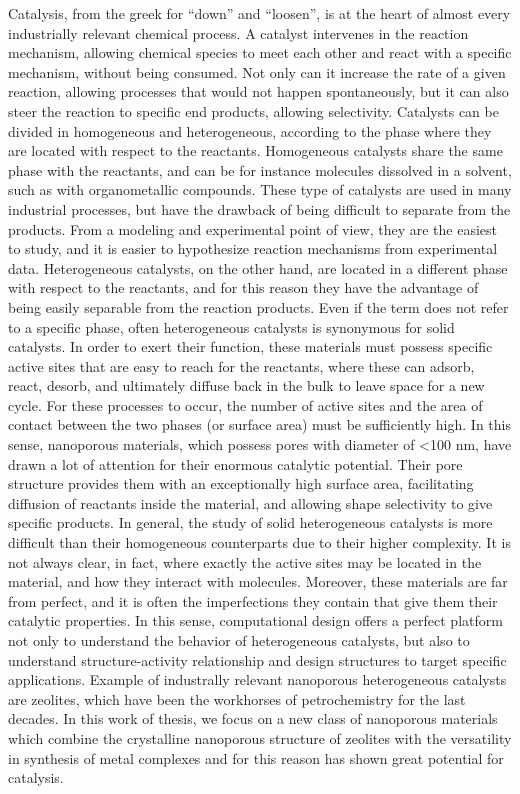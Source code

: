 Catalysis, from the greek for ``down'' and ``loosen'', is at the heart of almost every industrially relevant chemical process. A catalyst intervenes in the reaction mechanism, allowing chemical species to meet each other and react with a specific mechanism, without being consumed. Not only can it increase the rate of a given reaction, allowing processes that would not happen spontaneously, but it can also steer the reaction to specific end products, allowing selectivity. Catalysts can be divided in homogeneous and heterogeneous, according to the phase where they are located with respect to the reactants. Homogeneous catalysts share the same phase with the reactants, and can be for instance molecules dissolved in a solvent, such as with organometallic compounds. These type of catalysts are used in many industrial processes,  but have the drawback of being difficult to separate from the products. From a modeling and experimental point of view, they are the easiest to study, and it is easier to hypothesize reaction mechanisms from experimental data. Heterogeneous catalysts, on the other hand, are located in a different phase with respect to the reactants, and for this reason they have the advantage of being easily separable from the reaction products. Even if the term does not refer to a specific phase, often heterogeneous catalysts is synonymous for solid catalysts. In order to exert their function, these materials must possess specific active sites that are easy to reach for the reactants, where these can adsorb, react, desorb, and ultimately diffuse back in the bulk to leave space for a new cycle. For these processes to occur, the number of active sites and the area of contact between the two phases (or surface area) must be sufficiently high. In this sense, nanoporous materials, which possess pores with diameter of <100 nm, have drawn a lot of attention for their enormous catalytic potential. Their pore structure provides them with an exceptionally high surface area, facilitating diffusion of reactants inside the material, and allowing shape selectivity to give specific products. In general, the study of solid heterogeneous catalysts is more difficult than their homogeneous counterparts due to their higher complexity. It is not always clear, in fact, where exactly the active sites may be located in the material, and how they interact with molecules. Moreover, these materials are far from perfect, and it is often the imperfections they contain that give them their catalytic properties. In this sense, computational design offers a perfect platform not only to understand the behavior of heterogeneous catalysts, but also to understand structure-activity relationship and design structures to target specific applications. Example of industrally relevant nanoporous heterogeneous catalysts are zeolites, which have been the workhorses of petrochemistry for the last decades. In this work of thesis, we focus on a new class of nanoporous materials which combine the crystalline nanoporous structure of zeolites with the versatility in synthesis of metal complexes and for this reason has shown great potential for catalysis.


